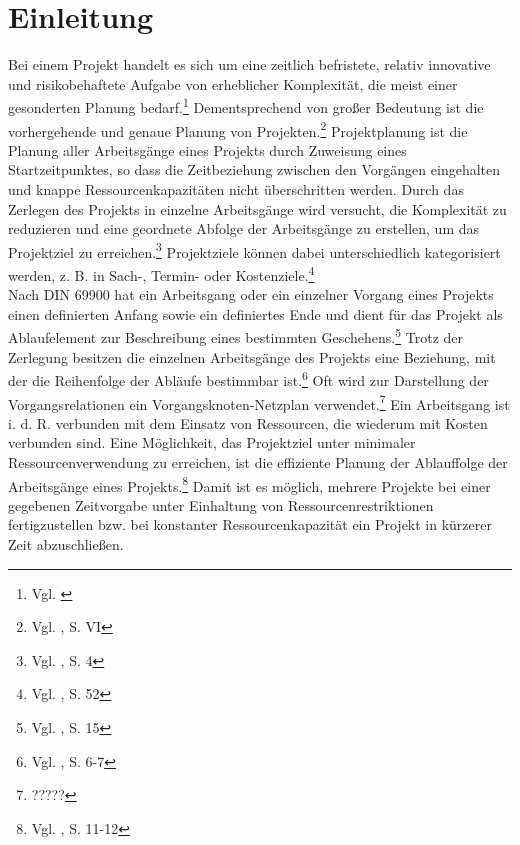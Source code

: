 \documentclass[a4paper,12pt,parskip,bibtotoc,liststotoc]{article}
\begin{document}

\section{Einleitung} \label{start}
Bei einem Projekt handelt es sich um eine zeitlich befristete, relativ innovative und risikobehaftete Aufgabe von erheblicher Komplexität, die meist einer gesonderten Planung bedarf.\footnote{Vgl. \cite{projektdef}} Dementsprechend von großer Bedeutung ist die vorhergehende und genaue Planung von Projekten.\footnote{Vgl. \cite{zimmermann2006projektplanung}, S. VI\label{zum}} Projektplanung ist die Planung aller Arbeitsgänge eines Projekts durch Zuweisung eines Startzeitpunktes, so dass die Zeitbeziehung zwischen den Vorgängen eingehalten und knappe Ressourcenkapazitäten nicht überschritten werden. Durch das Zerlegen des Projekts in einzelne Arbeitsgänge wird versucht, die Komplexität zu reduzieren und eine geordnete Abfolge der Arbeitsgänge zu erstellen, um das Projektziel zu erreichen.\footnote{Vgl. \cite{zimmermann2006projektplanung}, S. 4} Projektziele können dabei unterschiedlich kategorisiert werden, z. B. in Sach-, Termin- oder Kostenziele.\footnote{Vgl. \cite{felkai2011analysieren}, S. 52}\\

Nach DIN 69900 hat ein Arbeitsgang oder ein einzelner Vorgang eines Projekts einen definierten Anfang sowie ein definiertes Ende und dient für das Projekt als Ablaufelement zur Beschreibung eines bestimmten Geschehens.\footnote{Vgl. \cite{69900D}, S. 15} Trotz der Zerlegung besitzen die einzelnen Arbeitsgänge des Projekts eine Beziehung, mit der die Reihenfolge der Abläufe bestimmbar ist.\footnote{Vgl. \cite{kellenbrink2014einfuhrung}, S. 6-7} Oft wird zur Darstellung der Vorgangsrelationen ein Vorgangsknoten-Netzplan verwendet.\footnote{?????} %
Ein Arbeitsgang ist i. d. R. verbunden mit dem Einsatz von Ressourcen, die wiederum mit Kosten verbunden sind. Eine Möglichkeit, das Projektziel unter minimaler Ressourcenverwendung zu erreichen, ist die effiziente Planung der Ablauffolge der Arbeitsgänge eines Projekts.\footnote{Vgl. \cite{bartels2009projektplanung}, S. 11-12} Damit ist es möglich, mehrere Projekte bei einer gegebenen Zeitvorgabe unter Einhaltung von Ressourcenrestriktionen fertigzustellen bzw. bei konstanter Ressourcenkapazität ein Projekt in kürzerer Zeit abzuschließen. \\
\end{document}
